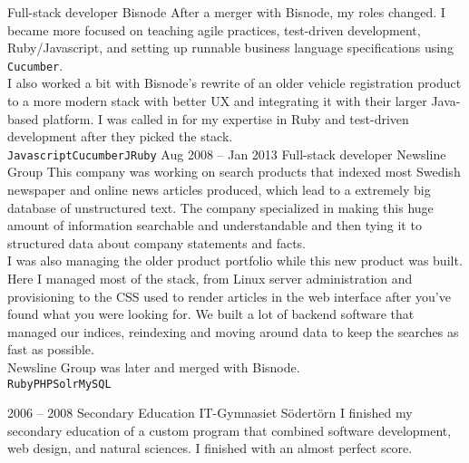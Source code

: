 \documentclass[9pt]{developercv} %
\begin{document}
\begin{entrylist}
    {Full-stack developer}
    {Bisnode}
    {After a merger with Bisnode, my roles changed. I became more focused on
      teaching agile practices, test-driven development, Ruby/Javascript, and
      setting up runnable business language specifications using
      \texttt{Cucumber}.\\ I also worked a bit with Bisnode's rewrite of an
      older vehicle registration product to a more modern stack with better
      UX and integrating it with their larger Java-based platform. I was called
      in for my expertise in Ruby and test-driven development after they picked
      the stack.\\
      \texttt{Javascript}\slashsep\texttt{Cucumber}\slashsep\texttt{JRuby}}
  \entry
    {Aug 2008 -- Jan 2013}
    {Full-stack developer}
    {Newsline Group}
    {This company was working on search products that indexed most Swedish
      newspaper and online news articles produced, which lead to a extremely
      big database of unstructured text. The company specialized in making this
      huge amount of information searchable and understandable and then tying
      it to structured data about company statements and facts.\\ I was also
      managing the older product portfolio while this new product was built.\\
      Here I managed most of the stack, from Linux server administration and
      provisioning to the CSS used to render articles in the web interface
      after you've found what you were looking for. We built a lot of backend
      software that managed our indices, reindexing and moving around data to
      keep the searches as fast as possible.\\ Newsline Group was later and
      merged with Bisnode.\\
      \texttt{Ruby}\slashsep\texttt{PHP}\slashsep\texttt{Solr}\slashsep\texttt{MySQL}}
\end{entrylist}



\begin{entrylist}
  \entry
    {2006 -- 2008}
    {Secondary Education}
    {IT-Gymnasiet Södertörn}
    {I finished my secondary education of a custom program that combined
      software development, web design, and natural sciences. I finished with
      an almost perfect score.}
\end{entrylist}
\end{document}
